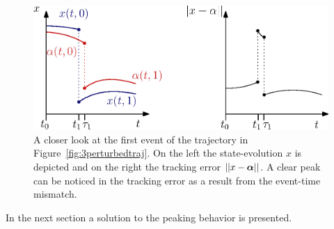 \documentclass[../DC2017114Bouma.tex]{subfiles}
\begin{document}
\begin{figure}[h]
\centering
\includegraphics[width=.66\textwidth]{peakerror.eps}\caption{A closer look at the first event of the trajectory in Figure~\ref{fig:3perturbedtraj}. On the left the state-evolution $x$ is depicted and on the right the tracking error $||x-\boldsymbol{\alpha}||$. A clear peak can be noticed in the tracking error as a result from the event-time mismatch.} \label{fig:3peakerror}
\end{figure}

In the next section a solution to the peaking behavior is presented.
%
%
%
%
%
\end{document}

